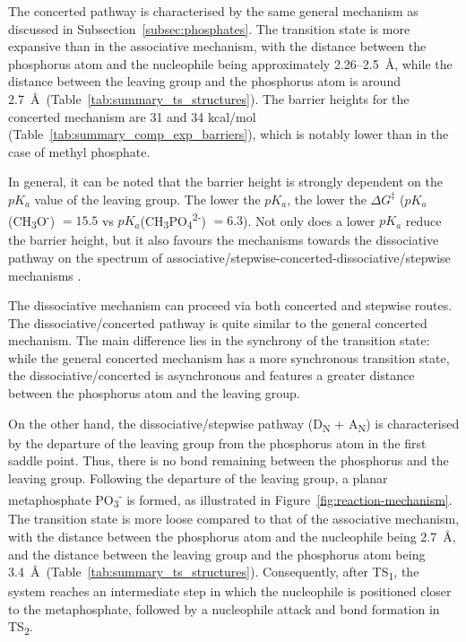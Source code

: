The concerted pathway is characterised by the same general mechanism as discussed in Subsection~\ref{subsec:phosphates}. The transition state is more expansive than in the associative mechanism, with the distance between the phosphorus atom and the nucleophile being approximately 2.26--2.5~\AA, while the distance between the leaving group and the phosphorus atom is around 2.7~\AA\ (Table~\ref{tab:summary_ts_structures}). The barrier heights for the concerted mechanism are 31 and 34 kcal/mol (Table~\ref{tab:summary_comp_exp_barriers}), which is notably lower than in the case of methyl phosphate.

In general, it can be noted that the barrier height is strongly dependent on the $pK_a$ value of the leaving group. The lower the $pK_a$, the lower the $\Delta G^{\ddagger}$ ($pK_a$(CH\textsubscript{3}O\textsuperscript{-}) $= 15.5$ vs $pK_a$(CH\textsubscript{3}PO\textsubscript{4}\textsuperscript{2-}) $= 6.3$). Not only does a lower $pK_a$ reduce the barrier height, but it also favours the mechanisms towards the dissociative pathway on the spectrum of associative/stepwise-concerted-dissociative/stepwise mechanisms \citep{klahnMechanismHydrolysisPhosphate2006}.

The dissociative mechanism can proceed via both concerted and stepwise routes. The dissociative/concerted pathway is quite similar to the general concerted mechanism. The main difference lies in the synchrony of the transition state: while the general concerted mechanism has a more synchronous transition state, the dissociative/concerted is asynchronous and features a greater distance between the phosphorus atom and the leaving group.

On the other hand, the dissociative/stepwise pathway (D\textsubscript{N} + A\textsubscript{N}) is characterised by the departure of the leaving group from the phosphorus atom in the first saddle point. Thus, there is no bond remaining between the phosphorus and the leaving group. Following the departure of the leaving group, a planar metaphosphate PO\textsubscript{3}\textsuperscript{-} is formed, as illustrated in Figure~\ref{fig:reaction-mechanism}. The transition state is more loose compared to that of the associative mechanism, with the distance between the phosphorus atom and the nucleophile being 2.7~\AA, and the distance between the leaving group and the phosphorus atom being 3.4~\AA\ (Table~\ref{tab:summary_ts_structures}). Consequently, after TS\textsubscript{1}, the system reaches an intermediate step in which the nucleophile is positioned closer to the metaphosphate, followed by a nucleophile attack and bond formation in TS\textsubscript{2}.

